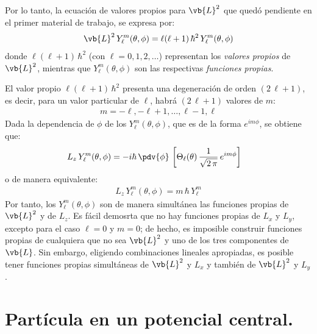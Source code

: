 Por lo tanto, la ecuación de valores propios para $\vb{L}^{2}$ que quedó pendiente en el primer material de trabajo, se expresa por:
\begin{align}
\vb{L}^{2} \, Y_{\ell}^{m} (\theta, \phi) = \ell (\ell + 1) \, \hbar^{2} \, Y_{\ell}^{m} (\theta, \phi)
\label{eq:ecuacion_66}
\end{align}
donde $\ell(\ell + 1) \, \hbar^{2}$ (con $\ell = 0, 1, 2, \ldots$) representan los \emph{valores propios} de $\vb{L}^{2}$, mientras que $Y_{\ell}^{m} (\theta, \phi)$ son las respectivas \emph{funciones propias}.
\par
El valor propio $\ell(\ell + 1) \, \hbar^{2}$ presenta una degeneración de orden $(2 \, \ell + 1)$, es decir, para un valor particular de $\ell$, habrá $(2 \, \ell + 1)$ valores de $m$:
\begin{align*}
m = -\ell, -\ell + 1, \ldots, \ell - 1, \ell
\end{align*}
Dada la dependencia de $\phi$ de los $Y_{\ell}^{m}(\theta, \phi)$, que es de la forma $e^{i m \phi}$, se obtiene que:
\begin{align*}
L_{z} \, Y_{\ell}^{m} (\theta, \phi) &= - i \hbar \, \pdv{\phi} \, \left[ \Theta_{\ell} (\theta) \, \dfrac{1}{\sqrt{2 \, \pi}} \, e^{i m \phi} \right]
\end{align*}
o de manera equivalente:
\begin{align}
L_{z} \, Y_{\ell}^{m} (\theta, \phi) = m \, \hbar \, Y_{\ell}^{m}
\label{eq:ecuacion_67}
\end{align}
Por tanto, los $Y_{\ell}^{m}(\theta, \phi)$ son de manera simultánea las funciones propias de $\vb{L}^{2}$ y de $L_{z}$. Es fácil demosrta que no hay funciones propias de $L_{x}$ y $L_{y}$, excepto para el caso $\ell = 0$ y $m = 0$; de hecho, es imposible construir funciones propias de cualquiera que no sea $\vb{L}^{2}$ y uno de los tres componentes de $\vb{L}$. Sin embargo, eligiendo combinaciones lineales apropiadas, es posible tener funciones propias simultáneas de $\vb{L}^{2}$ y $L_{x}$ y también de $\vb{L}^{2}$ y $L_{y}$.
\section{Partícula en un potencial central.}

